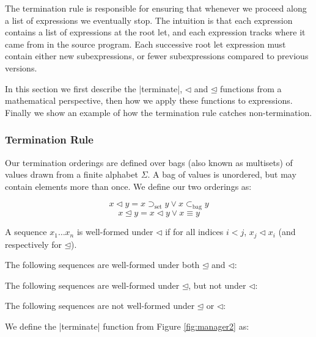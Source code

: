 \documentclass[draft]{sigplanconf}
\newcommand{\setsup}{\supset_{\mathrm{set}}}
\newcommand{\bagsub}{\subset_{\mathrm{bag}}}
\begin{document}
The termination rule is responsible for ensuring that whenever we proceed along a list of expressions we eventually stop. The intuition is that each expression contains a list of expressions at the root let, and each expression tracks where it came from in the source program. Each successive root let expression must contain either new subexpressions, or fewer subexpressions compared to previous versions.

In this section we first describe the |terminate|, $\lhd$ and $\unlhd$ functions from a mathematical perspective, then how we apply these functions to expressions. Finally we show an example of how the termination rule catches non-termination.

\subsubsection{Termination Rule}

Our termination orderings are defined over bags (also known as multisets) of values drawn from a finite alphabet $\Sigma$. A bag of values is unordered, but may contain elements more than once. We define our two orderings as:

\[
x \lhd y = x \setsup y \vee x \bagsub y
\]
\[
x \unlhd y = x \lhd y \vee x \equiv y
\]

A sequence $x_1 \ldots x_n$ is well-formed under $\lhd$ if for all indices $i < j$, $x_j \lhd x_i$ (and respectively for $\unlhd$).

The following sequences are well-formed under both $\unlhd$ and $\lhd$:

\begin{code}
\end{code}

The following sequences are well-formed under $\unlhd$, but not under $\lhd$:

\begin{code}
\end{code}

The following sequences are not well-formed under $\unlhd$ or $\lhd$:

\begin{code}
\end{code}

We define the |terminate| function from Figure \ref{fig:manager2} as:

\end{document}
